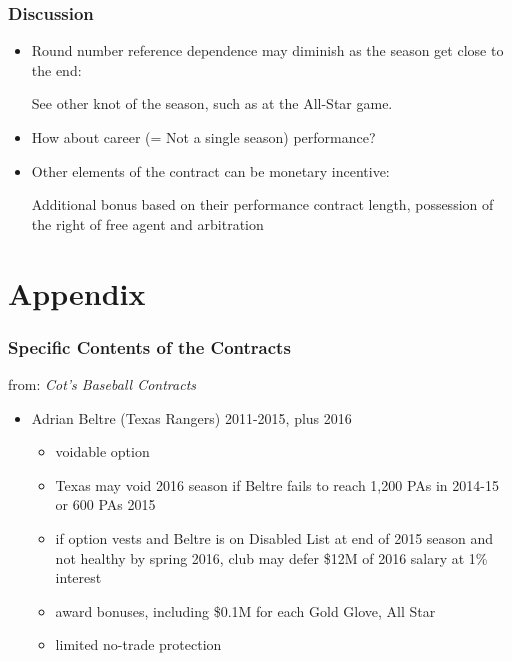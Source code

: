 \documentclass[dvipdfmx,12pt]{beamer}
\begin{document}
\begin{frame}\frametitle{Discussion}
  \begin{itemize}
    \item Round number reference dependence may diminish as the season
    get close to the end:

    See other knot of the season, such as at the All-Star game.

    \item How about career (= Not a single season) performance?

    \item Other elements of the contract can be monetary incentive:

    Additional bonus based on their performance contract length,
    possession of the right of free agent and arbitration


  \end{itemize}
\end{frame}

\section{Appendix}
\begin{frame}\frametitle{Specific Contents of the Contracts}
 from: \textit{Cot's Baseball Contracts}
  \begin{itemize}
    \item Adrian Beltre (Texas Rangers) 2011-2015, plus 2016
    \begin{itemize}
      \item voidable option

      \item Texas may void 2016 season if Beltre fails to
      reach 1,200 PAs in 2014-15 or 600 PAs 2015

      \item if option vests and Beltre is on Disabled List at end of
      2015 season and not healthy by spring 2016, club may defer
      \$12M of 2016 salary at 1\% interest

      \item award bonuses, including \$0.1M for each Gold Glove, All Star

      \item limited no-trade protection
    \end{itemize}
  \end{itemize}
\end{frame}
\end{document}
